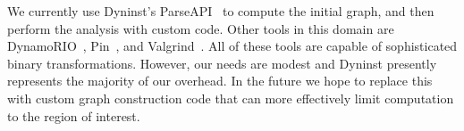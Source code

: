 We currently use Dyninst's ParseAPI~\cite{Ravipati:2007:Dyninst} to
compute the initial graph, and then perform the analysis with custom
code.  Other tools in this domain are
DynamoRIO~\cite{Bruening:2012:DynamoRIO}, Pin~\cite{Luk:2005:Pin}, and
Valgrind~\cite{Nethercote:2007:Valgrind}.  All of these tools are
capable of sophisticated binary transformations.  However, our needs
are modest and Dyninst presently represents the majority of our
overhead.  In the future we hope to replace this with custom graph
construction code that can more effectively limit computation to the
region of interest.



